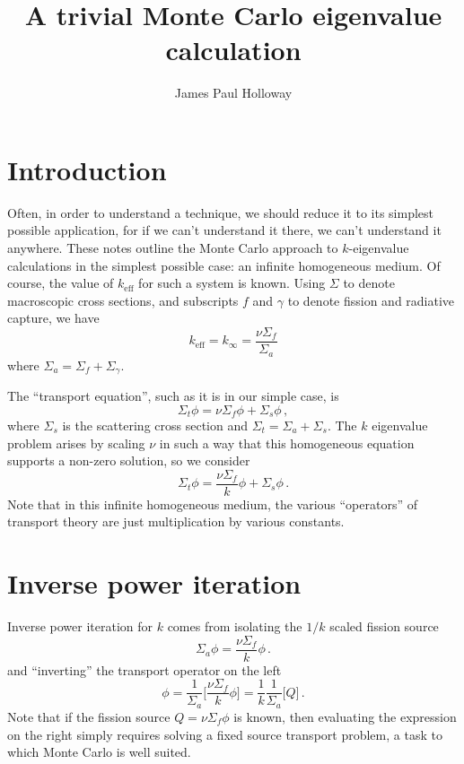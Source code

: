 \documentclass[12pt]{article}
\title{A trivial Monte Carlo eigenvalue calculation}
\author{James Paul Holloway}
\newcommand{\keff}{k_{\text{eff}}}
\begin{document}
\maketitle

\section{Introduction}

Often, in order to understand a technique, we should reduce it to its simplest possible application, for if we can't understand it there, we can't understand it anywhere.  These notes outline the Monte Carlo approach to $k$-eigenvalue calculations in the simplest possible case: an infinite homogeneous medium.  Of course, the value of $\keff$ for such a system is known.  Using $\Sigma$ to denote macroscopic cross sections, and subscripts $f$ and $\gamma$ to denote fission and radiative capture, we have
\begin{equation}
\keff = k_\infty = \frac{\nu \Sigma_f}{\Sigma_a}
\end{equation}
where $\Sigma_a = \Sigma_f + \Sigma_\gamma$.


The ``transport equation'', such as it is in our simple case, is
\begin{equation}
\Sigma_t  \phi = {\nu \Sigma_f} \phi + \Sigma_s \phi \,,
\end{equation}
where $\Sigma_s$ is the scattering cross section and $\Sigma_t = \Sigma_a + \Sigma_s$.  The $k$ eigenvalue problem arises by scaling $\nu$ in such a way that this homogeneous equation supports a non-zero solution, so we consider
\begin{equation}
\Sigma_t  \phi = \frac{\nu \Sigma_f}{k} \phi + \Sigma_s \phi \,.
\end{equation}
Note that in this infinite homogeneous medium, the various ``operators'' of transport theory are just multiplication by various constants.

\section{Inverse power iteration}

Inverse power iteration for $k$ comes from isolating the $1/k$ scaled fission source
\begin{equation}
\Sigma_a  \phi = \frac{\nu \Sigma_f}{k} \phi \,.
\end{equation}
and ``inverting'' the transport operator on the left
\begin{equation}
\phi = \frac{1}{\Sigma_a} \biggl[\frac{\nu \Sigma_f}{k} \phi \biggr] = \frac{1}{k} \frac{1}{\Sigma_a} \biggl[Q \biggr]\,.  \label{eq:inverse}
\end{equation}
Note that if the fission source $Q = \nu\Sigma_f \phi$ is known, then evaluating the expression on the right simply requires solving a fixed source transport problem, a task to which Monte Carlo is well suited.
\end{document}
